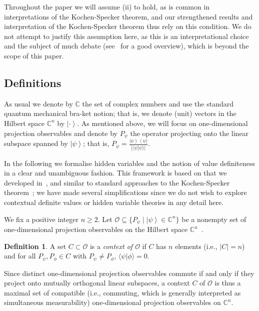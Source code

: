 \documentclass[%
 superscriptaddress,
 preprint,
 showpacs,
 showkeys,
 nofootinbib,
  amsmath,amssymb,
  aps,
  longbibliography,
  floatfix,
 ]{revtex4-1}
\theoremstyle{definition}
\newtheorem{definition}{Definition}
\newcommand{\C}{\mathbb{C}}
\newcommand{\bra}[1]{\left< #1 \right|}
\newcommand{\ket}[1]{\left| #1 \right>}
\newcommand{\iprod}[2]{\langle #1 | #2 \rangle}
\begin{document}
Throughout the paper we will assume (ii) to hold, as is common in interpretations of the Kochen-Specker theorem, and our strengthened results and interpretation of the Kochen-Specker theorem thus rely on this condition.
We do not attempt to justify this assumption here, as this is an interpretational choice and the subject of much debate (see~\cite[Chap. 4]{Ronde:2011aa} for a good overview), which is beyond the scope of this paper.


\subsection{Definitions}

As usual we denote by $\C$ the set of complex numbers and use the standard quantum mechanical bra-ket notion; that is, we denote (unit) vectors in the Hilbert space $\C^n$ by $\ket{\cdot}$.
{\color{blue}
As mentioned above, we will focus on one-dimensional projection observables and denote by $P_\psi$ the operator projecting onto the linear subspace spanned by $\ket{\psi}$; that is, $P_\psi=\frac{\ket{\psi}\bra{\psi}}{|\iprod{\psi}{\psi}|}$.
}

In the following we formalise hidden variables and the notion of value definiteness in a clear and unambiguous fashion.
This framework is based on that we developed in~\cite{Abbott:2012fk}, and similar to standard approaches to the Kochen-Specker theorem~\cite{Cabello:1994ly};
we have made several simplifications since we do not wish to explore contextual definite values or hidden variable theories in any detail here.

We fix a positive integer $n\ge 2$.
Let $\mathcal{O} \subseteq \{ P_\psi \mid \ket{\psi} \in \mathbb{C}^n \}$ be a nonempty set of {\color{blue} one-dimensional} projection observables on the Hilbert space $\mathbb{C}^n$~\cite{Halmos:1974qv}.
\begin{definition}
	A set $C\subset \mathcal{O}$ is a \emph{context of $\mathcal{O}$} if $C$ has $n$ elements (i.e., $|C|=n$) and for all $P_\psi,P_\phi\in C$ with $P_\psi \neq P_\phi$, $\iprod{\psi}{\phi}=0$.
\end{definition}
{\color{blue}
Since distinct one-dimensional projection observables commute if and only if they project onto mutually orthogonal linear subspaces, a context $C$ of $\mathcal{O}$ is thus a maximal set of compatible (i.e., commuting, which is generally interpreted as simultaneous measurability) one-dimensional projection observables on $\C^n$.
}
\end{document}

